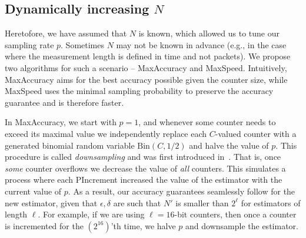 \begin{comment}
we can use the geometric sampling to determine how many bytes (size units) to ignore before sampling the next byte. If $\mathfrak w =  O(1/p)$ then this approach works well it will increase the counter $O(\mathfrak wp)=O(1)$ times and have a constant update time. 
However, if $\mathfrak w\gg 1/p$, this may be computationally expensive. 
Instead, we first break the update in two and set $w_1 = \floor{\mathfrak w p}$ and $w_2 = \mathfrak w - w_1/p$. We then deterministically increment the counter by $w_1$ and follow the geometric approach with the residual weight $w_2$.
Since $w_2<1/p$, our expected update time is constant. Furthermore, the deterministic update only decreases the variance in our counter and improves the accuracy.
\end{comment}

\subsection{Dynamically increasing $N$}
\label{sec:dynamicN}
Heretofore, we have assumed that $N$ is known, which allowed us to tune our sampling rate $p$. 
Sometimes $N$ may not be known in advance (e.g., in the case where the measurement length is defined in time and not packets). We propose two algorithms for such a scenario -- {\sc MaxAccuracy} and {\sc MaxSpeed}. Intuitively, {\sc MaxAccuracy} aims for the best accuracy possible given the counter size, while {\sc MaxSpeed} uses the minimal sampling probability to preserve the accuracy guarantee and is therefore faster.

In {\sc MaxAccuracy}, we start with $p=1$, and whenever some counter needs to exceed its maximal value we
independently replace each $C$-valued counter with a generated binomial random variable $\mbox{Bin}(C,1/2)$ and halve the value of $p$. This procedure is called \emph{downsampling} and was first introduced in~\cite{gibbons1998new}.
That is, once \emph{some} counter overflows we decrease the value of \emph{all} counters.
This simulates a process where each {\sc PIncrement} increased the value of the estimator with the current value of $p$. As a result, our accuracy guarantees seamlessly follow for the new estimator, given that $\epsilon,\delta$ are such that $N'$ is smaller than $2^\ell$ for estimators of length $\ell$.
For example, if we are using $\ell=16$-bit counters, then once a counter is incremented for the $(2^{16})$'th time, we halve $p$ and downsample the estimator. 

